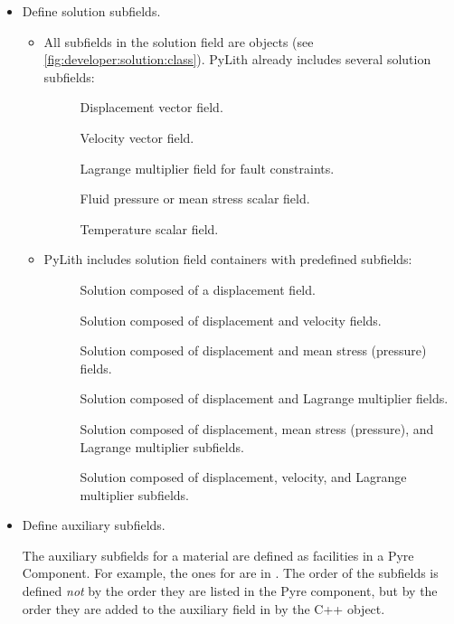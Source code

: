 \begin{itemize}
\item Define solution subfields.

  \begin{itemize}
  \item All subfields in the solution field are
     objects (see
    \vref{fig:developer:solution:class}). PyLith already includes
    several solution subfields:
    \begin{description}
    \item[] Displacement vector field.
    \item[] Velocity vector field.
    \item[] Lagrange multiplier field for
      fault constraints.
    \item[] Fluid pressure or mean stress scalar field.
    \item[] Temperature scalar field.
    \end{description}
  \item PyLith includes solution field containers with predefined
    subfields:
    \begin{description}
    \item[] Solution composed of a displacement field.
    \item[] Solution composed of displacement and velocity fields.
    \item[] Solution composed of displacement and
      mean stress (pressure) fields.
    \item[] Solution composed of displacement
      and Lagrange multiplier fields.
    \item[] Solution composed of
      displacement, mean stress (pressure), and Lagrange multiplier subfields.
    \item[] Solution composed of
      displacement, velocity, and Lagrange multiplier subfields.
    \end{description}
  \end{itemize}
%
\item Define auxiliary subfields.

  The auxiliary subfields for a material are defined as facilities in
  a Pyre Component. For example, the ones for
   are in
  . The order of the subfields
  is defined {\em not} by the order they are listed in the Pyre
  component, but by the order they are added to the auxiliary field in
  by the C++ object.


\end{itemize}

